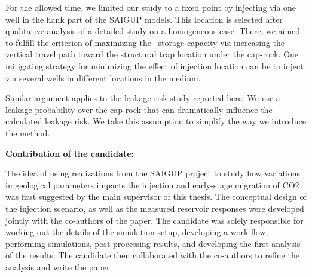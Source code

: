 {For the allowed time, we limited our study to a fixed point by injecting via one well in the flank part of the SAIGUP models. This location is selected after qualitative analysis of a detailed study on a homogeneous case. There, we aimed to fulfill the criterion of maximizing the \coo\ storage capacity via increasing the vertical travel path toward the structural trap location under the cap-rock. One mitigating strategy for minimizing the effect of injection location can be to inject via several wells in different locations in the medium.  

Similar argument applies to the leakage risk study reported here. We use a leakage probability over the cap-rock that can dramatically influence the calculated leakage risk. We take this assumption to simplify the way we introduce the method. 

\vspace{0.5cm}
\noindent\textbf{Contribution of the candidate:}

The idea of using realizations from the SAIGUP project to study how variations in geological parameters impacts the injection and early-stage migration of CO2 was first suggested by the main supervisor of this thesis. The conceptual design of the injection scenario, as well as the measured reservoir responses were developed jointly with the co-authors of the paper. The candidate was solely responsible for working out the details of the simulation setup, developing a work-flow, performing simulations, post-processing results, and developing the first analysis of the results. The candidate then collaborated with the co-authors to refine the analysis and write the paper.
}

